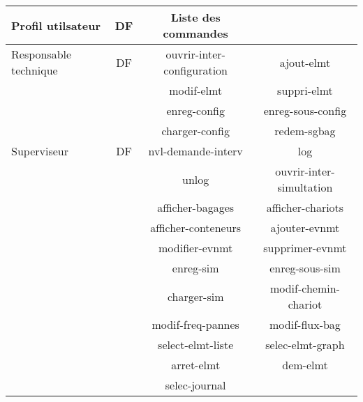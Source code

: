\begin{tabular}{|l|c|c c|}
\hline
Profil utilsateur & DF & Liste des commandes & \\
\hline
Responsable technique & DF &  ouvrir-inter-configuration & ajout-elmt \\
 & &  modif-elmt & suppri-elmt \\
 & &  enreg-config & enreg-sous-config \\
 & &  charger-config & redem-sgbag \\
\hline
Superviseur& DF & nvl-demande-interv & log \\
& & unlog & ouvrir-inter-simultation \\
& & afficher-bagages & afficher-chariots \\
& & afficher-conteneurs & ajouter-evnmt \\
& & modifier-evnmt & supprimer-evnmt \\
& & enreg-sim & enreg-sous-sim \\
& & charger-sim & modif-chemin-chariot \\
& & modif-freq-pannes & modif-flux-bag \\
& & select-elmt-liste & selec-elmt-graph \\
& & arret-elmt & dem-elmt \\
& & selec-journal & \\
\hline
\end{tabular}


